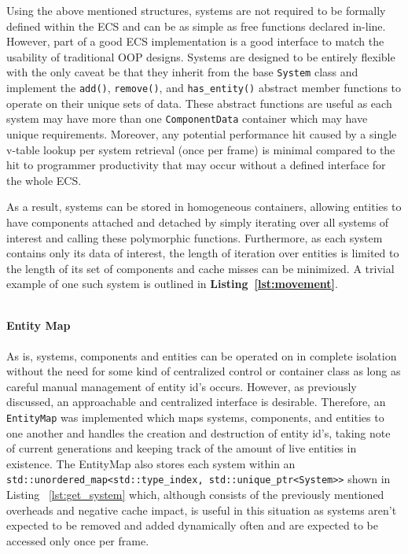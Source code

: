 \documentclass[10pt]{scrartcl}
\begin{document}
	Using the above mentioned structures, systems are not required to be formally defined within the ECS and can be as simple as free functions declared in-line. However, part of a good ECS implementation is a good interface to match the usability of traditional OOP designs. Systems are designed to be entirely flexible with the only caveat be that they inherit from the base \texttt{System} class and implement the \texttt{add()}, \texttt{remove()}, and \texttt{has_entity()} abstract member functions to operate on their unique sets of data. These abstract functions are useful as each system may have more than one \texttt{ComponentData} container which may have unique requirements. Moreover, any potential performance hit caused by a single v-table lookup per system retrieval (once per frame) is minimal compared to the hit to programmer productivity that may occur without a defined interface for the whole ECS.

	As a result, systems can be stored in homogeneous containers, allowing entities to have components attached and detached by simply iterating over all systems of interest and calling these polymorphic functions. Furthermore, as each system contains only its data of interest, the length of iteration over entities is limited to the length of its set of components and cache misses can be minimized. A trivial example of one such system is outlined in \textbf{Listing~\ref{lst:movement}}.

\inputminted[bgcolor=backcode,style=native]{cpp}{code/movement.cpp}
	

	\paragraph{Entity Map} %
	\label{par:entity_map}
	As is, systems, components and entities can be operated on in complete isolation without the need for some kind of centralized control or container class as long as careful manual management of entity id's occurs. However, as previously discussed, an approachable and centralized interface is desirable. Therefore, an \texttt{EntityMap} was implemented which maps systems, components, and entities to one another and handles the creation and destruction of entity id's, taking note of current generations and keeping track of the amount of live entities in existence. The EntityMap also stores each system within an \texttt{std::unordered_map<std::type_index, std::unique_ptr<System>>} shown in Listing ~\ref{lst:get_system} which, although consists of the previously mentioned overheads and negative cache impact, is useful in this situation as systems aren't expected to be removed and added dynamically often and are expected to be accessed only once per frame. 
\end{document}
